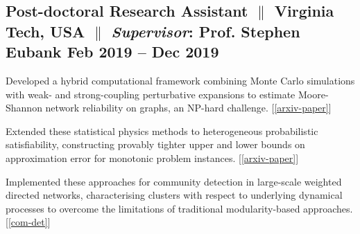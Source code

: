 

\subsection{Post-doctoral Research Assistant $\|$ Virginia Tech, USA $\|$ {\textit{Supervisor}}: Prof. Stephen Eubank \hfill Feb 2019 -- Dec 2019}
\begin{zitemize}
\item Developed a hybrid computational framework combining Monte Carlo simulations with weak- and strong-coupling perturbative expansions to estimate Moore-Shannon network reliability on graphs, an NP-hard challenge.
[{\ref{arxiv-paper}}]

\item Extended these statistical physics methods to heterogeneous probabilistic satisfiability, constructing provably tighter upper and lower bounds on approximation error for monotonic problem instances. [{\ref{arxiv-paper}}]

\item Implemented these approaches for community detection in large-scale weighted directed networks, characterising clusters with respect to underlying dynamical processes to overcome the limitations of traditional modularity-based approaches.
[{\ref{com-det}}]
\end{zitemize}

